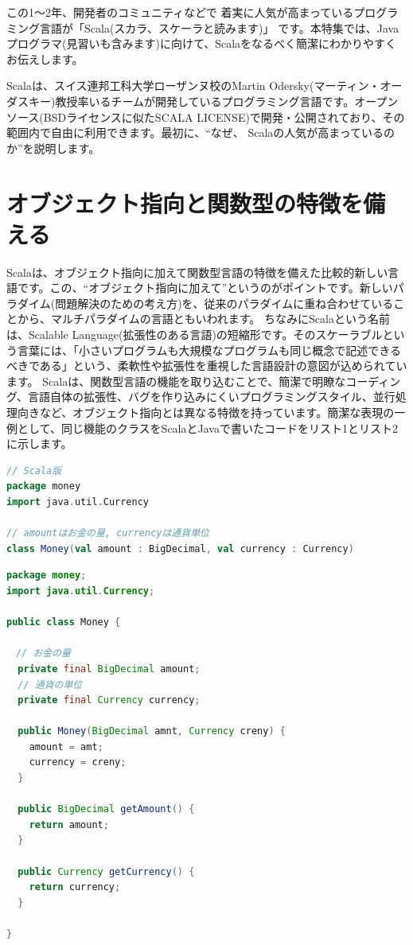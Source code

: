 \documentclass[10pt]{jarticle}
\begin{document}
  \begin{screen}
この1〜2年、開発者のコミュニティなどで 着実に人気が高まっているプログラミング言語が「Scala(スカラ、スケーラと読みます)」 です。本特集では、Javaプログラマ(見習いも含みます)に向けて、Scalaをなるべく簡潔にわかりやすくお伝えします。  
  \end{screen}

Scalaは、スイス連邦工科大学ローザンヌ校のMartin Odersky(マーティン・オーダスキー)教授率いるチームが開発しているプログラミング言語です。オープンソース(BSDライセンスに似たSCALA LICENSE)で開発・公開されており、その範囲内で自由に利用できます。最初に、“なぜ、 Scalaの人気が高まっているのか”を説明します。


\section*{オブジェクト指向と関数型の特徴を備える} 
Scalaは、オブジェクト指向に加えて関数型言語の特徴を備えた比較的新しい言語です。この、“オブジェクト指向に加えて”というのがポイントです。新しいパラダイム(問題解決のための考え方)を、従来のパラダイムに重ね合わせていることから、マルチパラダイムの言語ともいわれます。 ちなみにScalaという名前は、Scalable Language(拡張性のある言語)の短縮形です。そのスケーラブルという言葉には、「小さいプログラムも大規模なプログラムも同じ概念で記述できるべきである」という、柔軟性や拡張性を重視した言語設計の意図が込められています。 Scalaは、関数型言語の機能を取り込むことで、簡潔で明瞭なコーディング、言語自体の拡張性、バグを作り込みにくいプログラミングスタイル、並行処理向きなど、オブジェクト指向とは異なる特徴を持っています。簡潔な表現の一例として、同じ機能のクラスをScalaとJavaで書いたコードをリスト1とリスト2に示します。 

\begin{lstlisting}[language=scala, label=src:money_scala, caption=お金を表すクラスのScala版]
// Scala版
package money
import java.util.Currency

// amountはお金の量, currencyは通貨単位    
class Money(val amount : BigDecimal, val currency : Currency)    
\end{lstlisting}
 
\begin{lstlisting}[language=java, label=src:money_java, caption=お金を表すクラスのJava版]
package money;
import java.util.Currency;

public class Money {

　// お金の量
  private final BigDecimal amount;
  // 通貨の単位
  private final Currency currency;

  public Money(BigDecimal amnt, Currency creny) {
    amount = amt;
    currency = creny;
  }

  public BigDecimal getAmount() {
    return amount;
  }

  public Currency getCurrency() {
    return currency;
  }

}
\end{lstlisting}
\end{document}
